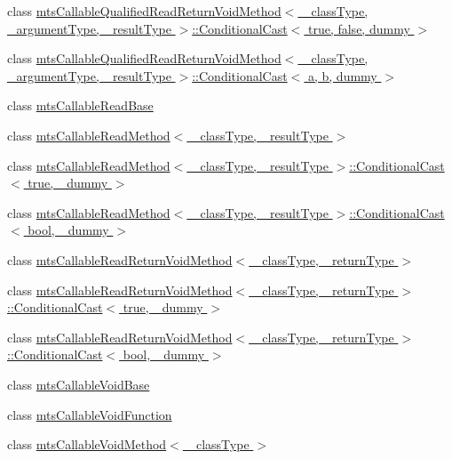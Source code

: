 \begin{DoxyCompactItemize}
\item 
class \hyperlink{classmts_callable_qualified_read_return_void_method_1_1_conditional_cast_3_01true_00_01false_00_01dummy_01_4}{mts\+Callable\+Qualified\+Read\+Return\+Void\+Method$<$ \+\_\+class\+Type, \+\_\+argument\+Type, \+\_\+result\+Type $>$\+::\+Conditional\+Cast$<$ true, false, dummy $>$}
\item 
class \hyperlink{classmts_callable_qualified_read_return_void_method_1_1_conditional_cast}{mts\+Callable\+Qualified\+Read\+Return\+Void\+Method$<$ \+\_\+class\+Type, \+\_\+argument\+Type, \+\_\+result\+Type $>$\+::\+Conditional\+Cast$<$ a, b, dummy $>$}
\item 
class \hyperlink{classmts_callable_read_base}{mts\+Callable\+Read\+Base}
\item 
class \hyperlink{classmts_callable_read_method}{mts\+Callable\+Read\+Method$<$ \+\_\+class\+Type, \+\_\+result\+Type $>$}
\item 
class \hyperlink{classmts_callable_read_method_1_1_conditional_cast_3_01true_00_01__dummy_01_4}{mts\+Callable\+Read\+Method$<$ \+\_\+class\+Type, \+\_\+result\+Type $>$\+::\+Conditional\+Cast$<$ true, \+\_\+dummy $>$}
\item 
class \hyperlink{classmts_callable_read_method_1_1_conditional_cast}{mts\+Callable\+Read\+Method$<$ \+\_\+class\+Type, \+\_\+result\+Type $>$\+::\+Conditional\+Cast$<$ bool, \+\_\+dummy $>$}
\item 
class \hyperlink{classmts_callable_read_return_void_method}{mts\+Callable\+Read\+Return\+Void\+Method$<$ \+\_\+class\+Type, \+\_\+return\+Type $>$}
\item 
class \hyperlink{classmts_callable_read_return_void_method_1_1_conditional_cast_3_01true_00_01__dummy_01_4}{mts\+Callable\+Read\+Return\+Void\+Method$<$ \+\_\+class\+Type, \+\_\+return\+Type $>$\+::\+Conditional\+Cast$<$ true, \+\_\+dummy $>$}
\item 
class \hyperlink{classmts_callable_read_return_void_method_1_1_conditional_cast}{mts\+Callable\+Read\+Return\+Void\+Method$<$ \+\_\+class\+Type, \+\_\+return\+Type $>$\+::\+Conditional\+Cast$<$ bool, \+\_\+dummy $>$}
\item 
class \hyperlink{classmts_callable_void_base}{mts\+Callable\+Void\+Base}
\item 
class \hyperlink{classmts_callable_void_function}{mts\+Callable\+Void\+Function}
\item 
class \hyperlink{classmts_callable_void_method}{mts\+Callable\+Void\+Method$<$ \+\_\+class\+Type $>$}
\item 

\end{DoxyCompactItemize}
